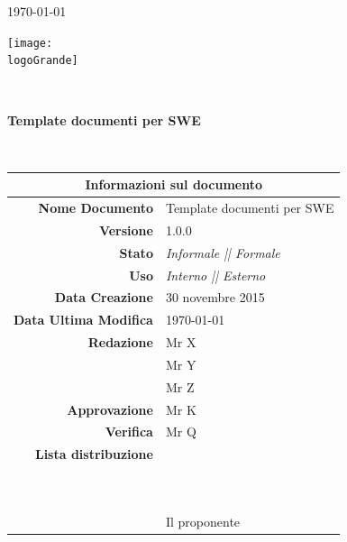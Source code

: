 \documentclass[12pt,a4paper]{article}
\title{\titoloDocumento}
\newcommand{\titoloDocumento}{Template documenti per SWE}
\newcommand{\dataCreazione}{30 novembre 2015}
\newcommand{\versione}{1.0.0}
\newcommand{\stato}{Informale || Formale}
\newcommand{\uso}{Interno || Esterno}
\begin{document}
\begin{titlepage}
\begin{center}
\today \\
\vspace{1cm}
\begin{Huge}
\textbf{\nomeTeam}
\end{Huge}
\vspace{1cm}
\texttt{[image: \\logoGrande]}
\vspace{1cm}

\HRule \\[0.4cm]
\begin{Huge}
{\huge \bfseries \titoloDocumento}\\[0.4cm]
\end{Huge}
\HRule \\[1cm]
\vfill

\begin{table}[h]
\begin{center}
\begin{tabular}{r | l}
\multicolumn{2}{c}{\textbf{Informazioni sul documento}}\\
\midrule
\textbf{Nome Documento}	&	\titoloDocumento	\\
\textbf{Versione}	&	\versione	\\
\textbf{Stato}	&	\emph{\stato}	\\
\textbf{Uso}	&	\emph{\uso}	\\
\textbf{Data Creazione}	&	\dataCreazione	\\
\textbf{Data Ultima Modifica}	&	\today	\\
\textbf{Redazione}	&	Mr X	\\
\ 	&	Mr Y	\\
\ 	&	Mr Z	\\
\textbf{Approvazione}	&	Mr K	\\
\textbf{Verifica}	&	Mr Q	\\
\textbf{Lista distribuzione}	&	\nomeTeam	\\
\ 	&	\Vardanega	\\
\ 	&	\Cardin	\\
\ 	&	Il proponente \Zucchetti	\\

\end{tabular}
\end{center}
\end{table}

\end{center}
\end{titlepage}
\newpage
\end{document}
